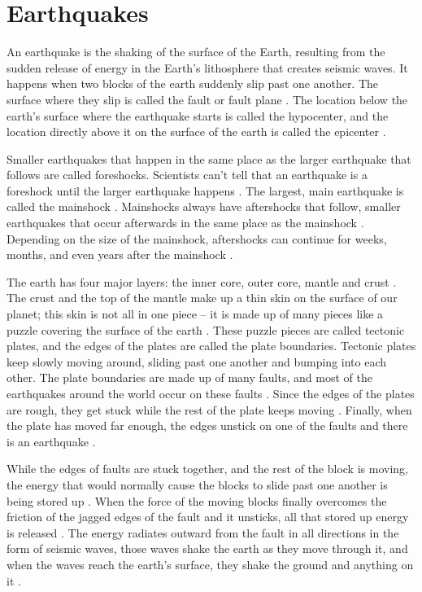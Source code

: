\documentclass[]{llncs} %
\begin{document}
\section{Earthquakes}
An earthquake is the shaking of the surface of the Earth, resulting from the sudden release of energy in the Earth’s lithosphere that creates seismic waves. It happens when two blocks of the earth suddenly slip past one another. The surface where they slip is called the fault or fault plane \cite{Wald}. The location below the earth’s surface where the earthquake starts is called the hypocenter, and the location directly above it on the surface of the earth is called the epicenter \cite{Wald}. \par
Smaller earthquakes that happen in the same place as the larger earthquake that follows are called foreshocks. Scientists can’t tell that an earthquake is a foreshock until the larger earthquake happens \cite{Wald}. The largest, main earthquake is called the mainshock \cite{Wald}. Mainshocks always have aftershocks that follow, smaller earthquakes that occur afterwards in the same place as the mainshock \cite{Wald}. Depending on the size of the mainshock, aftershocks can continue for weeks, months, and even years after the mainshock \cite{Wald}.\par
The earth has four major layers: the inner core, outer core, mantle and crust \cite{Wald}. The crust and the top of the mantle make up a thin skin on the surface of our planet; this skin is not all in one piece – it is made up of many pieces like a puzzle covering the surface of the earth \cite{Wald}. These puzzle pieces are called tectonic plates, and the edges of the plates are called the plate boundaries. Tectonic plates keep slowly moving around, sliding past one another and bumping into each other. The plate boundaries are made up of many faults, and most of the earthquakes around the world occur on these faults \cite{Wald}. Since the edges of the plates are rough, they get stuck while the rest of the plate keeps moving \cite{Wald}. Finally, when the plate has moved far enough, the edges unstick on one of the faults and there is an earthquake \cite{Wald}. \par
While the edges of faults are stuck together, and the rest of the block is moving, the energy that would normally cause the blocks to slide past one another is being stored up \cite{Wald}. When the force of the moving blocks finally overcomes the friction of the jagged edges of the fault and it unsticks, all that stored up energy is released \cite{Wald}. The energy radiates outward from the fault in all directions in the form of seismic waves, those waves shake the earth as they move through it, and when the waves reach the earth’s surface, they shake the ground and anything on it \cite{Wald}. \par
\end{document}
